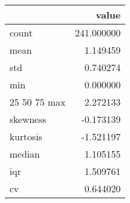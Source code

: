 \begin{tabular}{lr}
\toprule
 & value \\
\midrule
count & 241.000000 \\
mean & 1.149459 \\
std & 0.740274 \\
min & 0.000000 \\
25%
50%
75%
max & 2.272133 \\
skewness & -0.173139 \\
kurtosis & -1.521197 \\
median & 1.105155 \\
iqr & 1.509761 \\
cv & 0.644020 \\
\bottomrule
\end{tabular}
